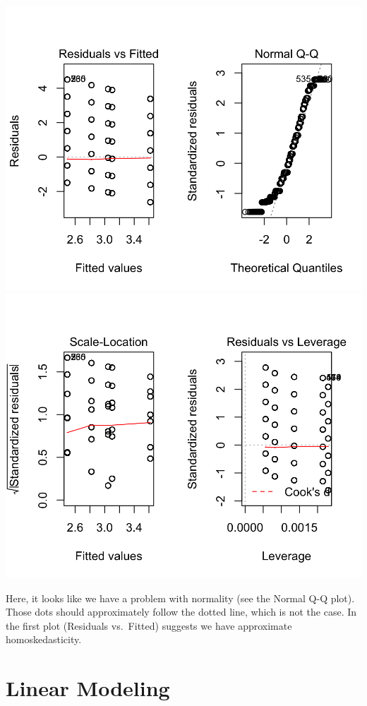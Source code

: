 \documentclass[]{tufte-book}
\theoremstyle{definition}
\theoremstyle{definition}
\theoremstyle{remark}
\begin{document}
\includegraphics{_main_files/figure-latex/unnamed-chunk-65-1}
\includegraphics{_main_files/figure-latex/unnamed-chunk-65-2}

Here, it looks like we have a problem with normality (see the Normal Q-Q
plot). Those dots should approximately follow the dotted line, which is
not the case. In the first plot (Residuals vs.~Fitted) suggests we have
approximate homoskedasticity.

\section*{Linear Modeling}\label{linear-modeling}
\end{document}
